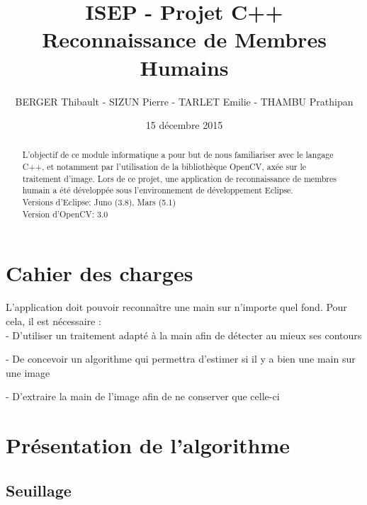 \documentclass[10pt,a4paper]{report}
\begin{document}
\title{ISEP - Projet C++\\Reconnaissance de Membres Humains}
\author{BERGER Thibault - SIZUN Pierre - TARLET Emilie - THAMBU Prathipan}
\date{15 d\'ecembre 2015}
\maketitle

\begin{abstract}
L'objectif de ce module informatique a pour but de nous familiariser avec le langage C++, et notamment par l'utilisation de la bibliothèque OpenCV, axée sur le traitement d'image.
Lors de ce projet, une application de reconnaissance de membres humain a été développée sous l'environnement de développement Eclipse.\\
\newline
Versions d'Eclipse: Juno (3.8), Mars (5.1)\\
Version d'OpenCV: 3.0
\end{abstract}

\tableofcontents
\newpage


\section{Cahier des charges}

L'application doit pouvoir reconnaître une main sur n’importe quel fond.  Pour cela, il est nécessaire :\\

	- D'utiliser un traitement adapté à la main afin de détecter au mieux ses contours
	
	- De concevoir un algorithme qui permettra d’estimer si il y a bien une main sur une image 
	
	- D'extraire la main de l’image afin de ne conserver que celle-ci


\section{Présentation de l'algorithme}
\subsection{Seuillage}
\end{document}
